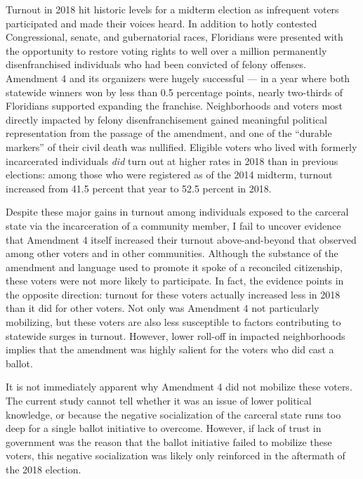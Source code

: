\documentclass[
  12pt,
]{article}
\begin{document}
Turnout in 2018 hit historic levels for a midterm election as infrequent voters participated and made their voices heard. In addition to hotly contested Congressional, senate, and gubernatorial races, Floridians were presented with the opportunity to restore voting rights to well over a million permanently disenfranchised individuals who had been convicted of felony offenses. Amendment 4 and its organizers were hugely successful --- in a year where both statewide winners won by less than 0.5 percentage points, nearly two-thirds of Floridians supported expanding the franchise. Neighborhoods and voters most directly impacted by felony disenfranchisement gained meaningful political representation from the passage of the amendment, and one of the ``durable markers'' of their civil death was nullified. Eligible voters who lived with formerly incarcerated individuals \emph{did} turn out at higher rates in 2018 than in previous elections: among those who were registered as of the 2014 midterm, turnout increased from 41.5 percent that year to 52.5 percent in 2018.

Despite these major gains in turnout among individuals exposed to the carceral state via the incarceration of a community member, I fail to uncover evidence that Amendment 4 itself increased their turnout above-and-beyond that observed among other voters and in other communities. Although the substance of the amendment and language used to promote it spoke of a reconciled citizenship, these voters were not more likely to participate. In fact, the evidence points in the opposite direction: turnout for these voters actually increased less in 2018 than it did for other voters. Not only was Amendment 4 not particularly mobilizing, but these voters are also less susceptible to factors contributing to statewide surges in turnout. However, lower roll-off in impacted neighborhoods implies that the amendment was highly salient for the voters who did cast a ballot.

It is not immediately apparent why Amendment 4 did not mobilize these voters. The current study cannot tell whether it was an issue of lower political knowledge, or because the negative socialization of the carceral state runs too deep for a single ballot initiative to overcome. However, if lack of trust in government was the reason that the ballot initiative failed to mobilize these voters, this negative socialization was likely only reinforced in the aftermath of the 2018 election.
\end{document}
